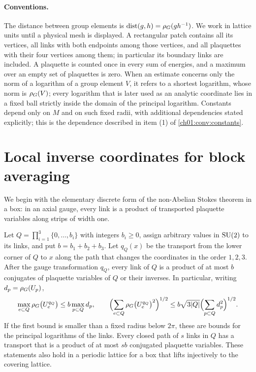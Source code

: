 \paragraph{Conventions.}
The distance between group elements is $\operatorname{dist}(g,h)=\rho_G(gh^{-1})$. We work in lattice units until a physical mesh is displayed. A rectangular patch contains all its vertices, all links with both endpoints among those vertices, and all plaquettes with their four vertices among them; in particular its boundary links are included. A plaquette is counted once in every sum of energies, and a maximum over an empty set of plaquettes is zero. When an estimate concerns only the norm of a logarithm of a group element $V$, it refers to a shortest logarithm, whose norm is $\rho_G(V)$; every logarithm that is later used as an analytic coordinate lies in a fixed ball strictly inside the domain of the principal logarithm. Constants depend only on $M$ and on such fixed radii, with additional dependencies stated explicitly; this is the dependence described in item (1) of \cref{ch01:conv:constants}.

\section{Local inverse coordinates for block averaging}\label{ch04:sec:coordinates}

We begin with the elementary discrete form of the non-Abelian Stokes theorem in a box: in an axial gauge, every link is a product of transported plaquette variables along strips of width one.

\begin{lemma}\label{ch04:lem:axial-strips}
Let $Q=\prod_{i=1}^3\{0,\dots,b_i\}$ with integers $b_i\ge0$, assign arbitrary values in $\mathrm{SU}(2)$ to its links, and put $b=b_1+b_2+b_3$. Let $q_Q(x)$ be the transport from the lower corner of $Q$ to $x$ along the path that changes the coordinates in the order $1,2,3$. After the gauge transformation $q_Q$, every link of $Q$ is a product of at most $b$ conjugates of plaquette variables of $Q$ or their inverses. In particular, writing $d_p=\rho_G(U_p)$,
\[
 \max_{e\subset Q}\rho_G\bigl(U_e^{q_Q}\bigr)\le b\max_{p\subset Q}d_p,\qquad
 \Bigl(\sum_{e\subset Q}\rho_G\bigl(U_e^{q_Q}\bigr)^2\Bigr)^{1/2}\le b\sqrt{3\lvert Q\rvert}\Bigl(\sum_{p\subset Q}d_p^2\Bigr)^{1/2}.
\]
If the first bound is smaller than a fixed radius below $2\pi$, these are bounds for the principal logarithms of the links. Every closed path of $s$ links in $Q$ has a transport that is a product of at most $sb$ conjugated plaquette variables. These statements also hold in a periodic lattice for a box that lifts injectively to the covering lattice.
\end{lemma}


